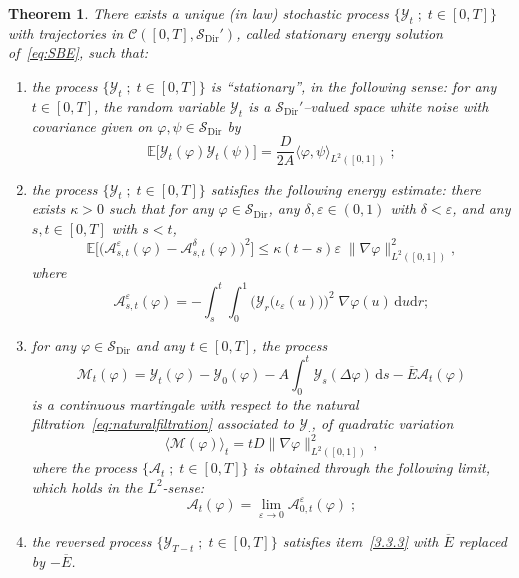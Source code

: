 \documentclass[10pt]{amsart}
\newtheorem{theo}{Theorem}[section]
\theoremstyle{definition}\newtheorem{defi}[theo]{Definition}\newtheorem{rema}[theo]{Remark}\newtheorem{exam}[theo]{Example}\newtheorem{exem}[theo]{Example}\newtheorem{nota}[theo]{Notation}
\DeclareMathOperator{\Dir}{Dir}
\newcommand{\bb}[1]{{\mathbb #1}}
\newcommand{\mc}[1]{{\mathcal #1}}
\renewcommand{\mc}[1]{{\mathcal #1}}
\newcommand{\SD}{\ensuremath{\mc S_{\Dir}}}
\renewcommand{\bar}{\overline}
\renewcommand{\leq}{\leqslant}
\newcommand*{\dd}{\mathrm{d}}
\newcommand*{\dr}{\dd r}
\newcommand*{\ds}{\dd s}
\newcommand*{\du}{\dd u}
\begin{document}
\begin{theo}\label{def:energy}
There exists a unique (in law) stochastic process $\{\mc Y_t \; ; \; t \in [0,T]\}$ with trajectories in $\mc C([0,T],\SD')$, called \emph{stationary energy solution} of~\eqref{eq:SBE}, such that:
\begin{enumerate}
\item \label{3.3.1} the process $\{\mc Y_t \; ; \; t \in [0,T]\}$ is \emph{``stationary''}, in the following sense: for any $t\in[0,T]$, the random variable $\mc Y_t$ is a $\SD'$--valued space white noise with covariance given on $\varphi,\psi \in \SD$ by
\[
\bb E \big[\mc Y_t(\varphi) \mc Y_t(\psi)\big] =\frac{D}{2A} \langle \varphi, \psi \rangle_{L^2([0,1])}\; ;
\]
\item \label{3.3.2} the process $\{\mc Y_t \; ; \; t \in [0,T]\}$ satisfies the following \emph{energy estimate}: there exists $\kappa >0$ such that for any $\varphi \in \mc S_{\Dir}$, any $\delta,\varepsilon \in (0,1)$ with $\delta < \varepsilon$, and any $s,t \in [0,T]$ with $s<t$,
\begin{equation}\label{eq:lipschitz}
\bb E\Big[\big(\mc A_{s,t}^\varepsilon (\varphi) - \mc A_{s,t}^\delta(\varphi)\big)^2\Big] \leq \kappa (t-s) \varepsilon \; \big\| \nabla \varphi\big\|^2_{L^2([0,1])},
\end{equation}
where
\begin{equation}
\mc A_{s,t}^\varepsilon(\varphi)= - \int_s^t \int_0^1 \Big(\mc Y_r\big(\iota_\varepsilon(u)\big)\Big)^2 \; \nabla \varphi(u)\,\du \dr; \label{eq:A}
\end{equation}
\item \label{3.3.3}
for any $\varphi \in \mc S_{\Dir}$ and any $t\in[0,T]$, the process
\[
\mc M_t (\varphi) = \mc Y_t(\varphi)-\mc Y_0(\varphi) - A \int_0^t \mc Y_s(\Delta \varphi)\,\ds - \bar E \mc A_t(\varphi)
\]
is a continuous martingale with respect to the natural filtration~\eqref{eq:naturalfiltration} associated to $\mc Y_\cdot$, of quadratic variation
\[
\big\langle \mc M (\varphi) \big\rangle_t = t D \big\|\nabla \varphi\big\|^2_{L^2([0,1])}\,,
\]
where the process $\{\mc A_t\; ; \; t\in[0,T]\}$ is obtained through the following limit, which holds in the $L^2$-sense:
\begin{equation}
\mc A_t(\varphi)= \lim_{\varepsilon \to 0} \mc A_{0,t}^\varepsilon(\varphi)\; ;\label{eq:B}
\end{equation}
\item \label{3.3.4} the reversed process $\{\mc Y_{T-t}\; ; \; t \in [0,T]\}$ satisfies item~\eqref{3.3.3} with $\bar E$ replaced by $-\bar E$.
\end{enumerate}
\end{theo}
\end{document}
